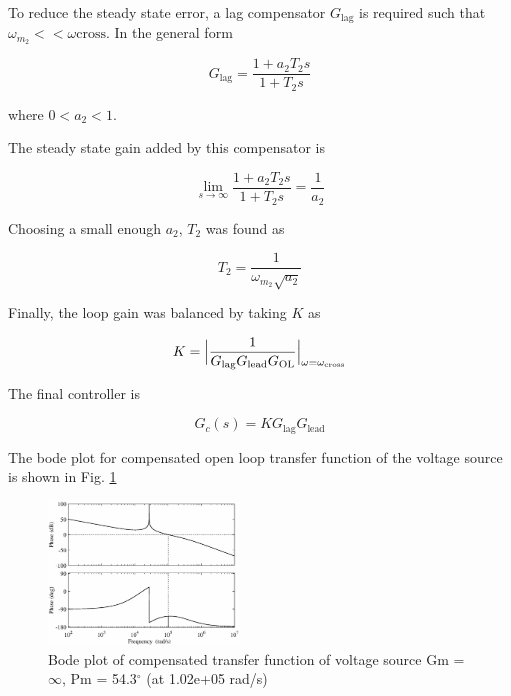 \documentclass[a4paper]{IEEEtran}
\begin{document}
    To reduce the steady state error, a lag compensator $G_{\text{lag}}$ is required such that $\omega_{m_2} << \omega{\text{cross}}$. In the general form

    \begin{equation}
    	G_{\text{lag}} = \dfrac{1+a_2T_2s}{1+T_2s}
	    \label{eq:55}    
    \end{equation}

    where $0 < a_2 < 1$.

    The steady state gain added by this compensator is 

    \begin{equation}
    	\lim_{s\to\infty} \dfrac{1+a_2T_2s}{1+T_2s} = \dfrac{1}{a_2}
	    \label{eq:56}    
    \end{equation}

    Choosing a small enough $a_2$, $T_2$ was found as

    \begin{equation}
		T_2 = \dfrac{1}{\omega_{m_2}\sqrt{a_2}}
		\label{eq:57}
    \end{equation}

    Finally, the loop gain was balanced by taking $K$ as

    \begin{equation}
		K = \Bigl| \dfrac{1}{G_{\text{lag}} G_{\text{lead}} G_{\text{OL}}} \Bigr|_{\omega = \omega_{\text{cross}}}
		\label{eq:58}
    \end{equation}

    The final controller is

    \begin{equation}
		G_c(s) = K G_{\text{lag}} G_{\text{lead}}
		\label{eq:59}
    \end{equation}

    The bode plot for compensated open loop transfer function of the voltage source is shown in Fig. \ref{fig:comp-vs}

	\begin{figure}
		\centering
		\includegraphics[width=0.45\textwidth]{compensated-vs}
		\caption{Bode plot of compensated transfer function of voltage source Gm = $\infty$,  Pm = 54.3$^\circ$ (at 1.02e+05 rad/s)}
		\label{fig:comp-vs}
	\end{figure}
\end{document}
